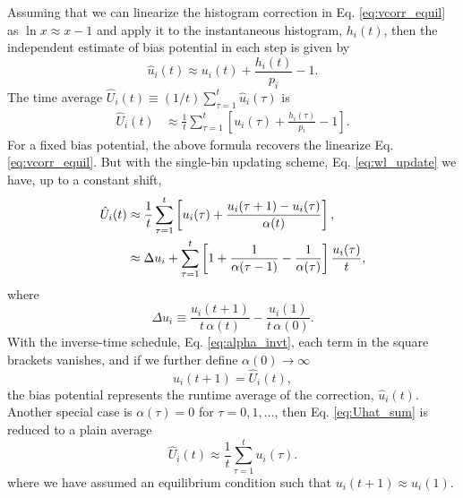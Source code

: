 \documentclass[reprint, superscriptaddress, floatfix]{revtex4-1}
\begin{document}
%
Assuming that we can linearize the histogram correction
in Eq. \eqref{eq:vcorr_equil} as
$\ln x \approx x - 1$ %
and apply it to the instantaneous histogram, $h_i(t)$,
then the independent estimate of bias potential in each step
is given by
%
\begin{equation*}
  \hat u_i(t) \approx u_i(t) + \frac{ h_i(t) } { p_i } - 1
  .
  \label{eq:uhatt}
\end{equation*}
%
The time average
$\hat U_i(t) \equiv (1/t) \sum_{\tau=1}^t \hat u_i(\tau)$
is
\begin{align}
  \hat U_i(t)
  &\approx
  \frac{1}{t} \sum_{\tau=1}^t
  \left[
    u_i(\tau) + \frac{ h_i(\tau) } { p_i } - 1
  \right]
  .
  \label{eq:Uhatt}
\end{align}
%
For a fixed bias potential, the above formula
recovers the linearize Eq. \eqref{eq:vcorr_equil}.
%
But with the single-bin updating scheme,
Eq. \eqref{eq:wl_update}
we have, up to a constant shift,
%
\begin{align}
  \hat U_i(t)
  &\approx
  \frac{1}{t} \sum_{\tau=1}^t
  \left[
    u_i(\tau) +
    \frac{ u_i(\tau + 1) - u_i(\tau) } { \alpha(t) }
  \right]
  ,
  \notag
  \\
  &\approx
  \Delta u_i
  +
  \sum_{\tau=1}^t
  \left[
    1 + \frac{1}{\alpha(\tau - 1)} - \frac{1}{\alpha(\tau)}
  \right]
  \frac{ u_i(\tau) } {t}
  ,
  \label{eq:Uhat_sum}
\end{align}
where
$$
\Delta u_i \equiv \frac{u_i(t+1)}{t \, \alpha(t)}
- \frac{u_i(1)}{t \, \alpha(0)}.
$$
%
With the inverse-time schedule, Eq. \eqref{eq:alpha_invt},
each term in the square brackets vanishes,
and if we further define $\alpha(0) \to \infty$
$$
u_i(t+1) = \hat U_i(t),
$$
the bias potential represents
the runtime average of the correction, $\hat u_i(t)$.
%
Another special case is $\alpha(\tau) = 0$ for $\tau = 0, 1, \dots$,
then Eq. \eqref{eq:Uhat_sum} is reduced to a plain average
$$
\hat U_i(t) \approx \frac 1 t \sum_{\tau=1}^t u_i(\tau).
$$
where we have assumed an equilibrium condition
such that $u_i(t+1) \approx u_i(1)$.
\end{document}
